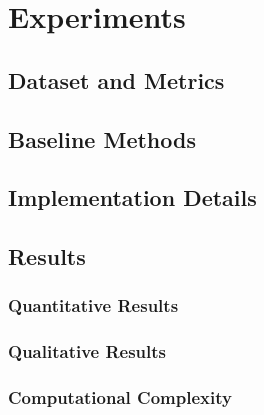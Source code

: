 
\cleardoublepage

\chapter{Experiments}
\label{experiments}

\section{Dataset and Metrics}
\label{dataset-metrics}

\section{Baseline Methods}
\label{baseline-methods}

\section{Implementation Details}
\label{implementation-details}

\section{Results}
\label{results}

\subsection{Quantitative Results}
\label{quantitative-results}

\subsection{Qualitative Results}
\label{qualitative-results}

\subsection{Computational Complexity}
\label{computational-complexity}

